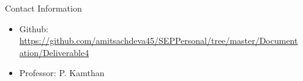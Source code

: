 \documentclass[final]{beamer}
\newlength{\sepwid}
\newlength{\onecolwid}
\begin{document}
\begin{frame}
\begin{columns}[t]
\begin{column}{\onecolwid}
\begin{block}{Contact Information}

\small{\begin{itemize}
\item Github: \url{https://github.com/amitsachdeva45/SEPPersonal/tree/master/Documentation/Deliverable4}
\item Professor: P. Kamthan
\end{itemize}}

\end{block}



\end{column} %

\begin{column}{\sepwid}\end{column} %

\end{columns} %

\end{frame} %
\end{document}

